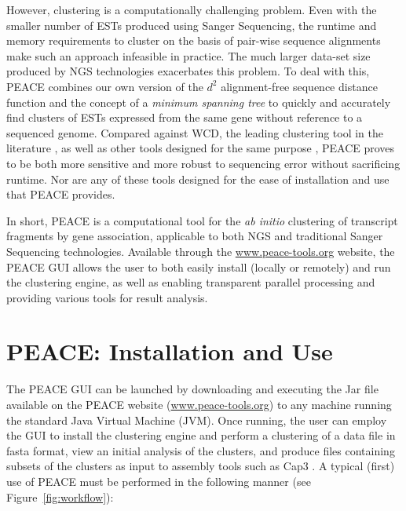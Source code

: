 \documentclass[a4,center,fleqn]{NAR}
\newcommand{\peace} {{\small PEACE}}
\newcommand{\wcd} {{\small WCD}}
\newcommand{\capthree} {{\small Cap3}}
\begin{document}
However, clustering is a computationally challenging problem.  Even
with the smaller number of ESTs produced using Sanger Sequencing, the
runtime and memory requirements to cluster on the basis of pair-wise
sequence alignments make such an approach infeasible in practice.  The
much larger data-set size produced by NGS technologies exacerbates
this problem.  To deal with this, \peace\/ combines our own version of
the $d^2$ alignment-free sequence distance function \cite{Hide94} and
the concept of a {\it minimum spanning tree} \cite{Prim57} to quickly
and accurately find clusters of ESTs expressed from the same gene
without reference to a sequenced genome.  Compared against \wcd, the
leading clustering tool in the literature \cite{Hazelhurst08a}, as well as
other tools designed for the same purpose 
\cite{Burke99,Slater00,Huang99,Parkinson02,Kalyanaraman03,Malde03,
  Ptitsyn05,Hazelhurst08a,Picardi09}, \peace\/ proves to be both more
sensitive and more robust to sequencing error without sacrificing
runtime.  Nor are any of these tools designed for the ease of installation
and use that \peace\/ provides.

In short, \peace\/ is a computational tool for the {\it ab initio}
clustering of transcript fragments by gene association, applicable to
both NGS and traditional Sanger Sequencing technologies.  Available
through the \href{http://www.peace-tools.org}{www.peace-tools.org}
website, the \peace\/ GUI allows the user to both easily install
(locally or remotely) and run the clustering engine, as well as
enabling transparent parallel processing and providing various tools
for result analysis.

\section{\peace: Installation and Use}

The \peace\/ GUI can be launched by downloading and executing the
Jar file available on the \peace\/ website
(\href{http://www.peace-tools.org}{www.peace-tools.org}) to any
machine running the standard Java Virtual Machine (JVM).  Once
running, the user can employ the GUI to install the clustering engine
and perform a clustering of a data file in {\sc fasta} format, view an
initial analysis of the clusters, and produce files containing subsets
of the clusters as input to assembly tools such as \capthree\/ 
\cite{Huang99}.  A typical (first) use of \peace\/ must be
performed in the following manner (see Figure~\ref{fig:workflow}):
\end{document}
